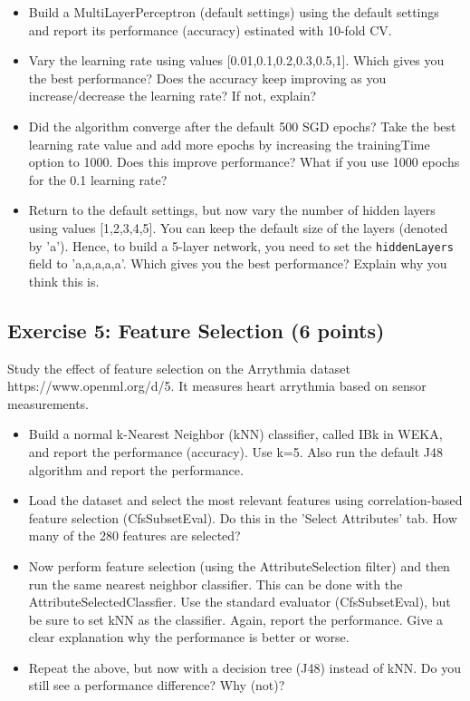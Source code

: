 \documentclass[11pt]{article}
\providecommand{\tightlist}{%
      \setlength{\itemsep}{0pt}\setlength{\parskip}{0pt}}
\begin{document}
\begin{itemize}
\tightlist
\item
  Build a MultiLayerPerceptron (default settings) using the default
  settings and report its performance (accuracy) estinated with 10-fold
  CV.
\item
  Vary the learning rate using values {[}0.01,0.1,0.2,0.3,0.5,1{]}.
  Which gives you the best performance? Does the accuracy keep improving
  as you increase/decrease the learning rate? If not, explain?
\item
  Did the algorithm converge after the default 500 SGD epochs? Take the
  best learning rate value and add more epochs by increasing the
  trainingTime option to 1000. Does this improve performance? What if
  you use 1000 epochs for the 0.1 learning rate?
\item
  Return to the default settings, but now vary the number of hidden
  layers using values {[}1,2,3,4,5{]}. You can keep the default size of
  the layers (denoted by 'a'). Hence, to build a 5-layer network, you
  need to set the \texttt{hiddenLayers} field to 'a,a,a,a,a'. Which
  gives you the best performance? Explain why you think this is.
\end{itemize}

    \subsection{Exercise 5: Feature Selection (6
points)}\label{exercise-5-feature-selection-6-points}

Study the effect of feature selection on the Arrythmia dataset
https://www.openml.org/d/5. It measures heart arrythmia based on sensor
measurements.

\begin{itemize}
\tightlist
\item
  Build a normal k-Nearest Neighbor (kNN) classifier, called IBk in
  WEKA, and report the performance (accuracy). Use k=5. Also run the
  default J48 algorithm and report the performance.
\item
  Load the dataset and select the most relevant features using
  correlation-based feature selection (CfsSubsetEval). Do this in the
  'Select Attributes' tab. How many of the 280 features are selected?
\item
  Now perform feature selection (using the AttributeSelection filter)
  and then run the same nearest neighbor classifier. This can be done
  with the AttributeSelectedClassfier. Use the standard evaluator
  (CfsSubsetEval), but be sure to set kNN as the classifier. Again,
  report the performance. Give a clear explanation why the performance
  is better or worse.
\item
  Repeat the above, but now with a decision tree (J48) instead of kNN.
  Do you still see a performance difference? Why (not)?
\end{itemize}
\end{document}
